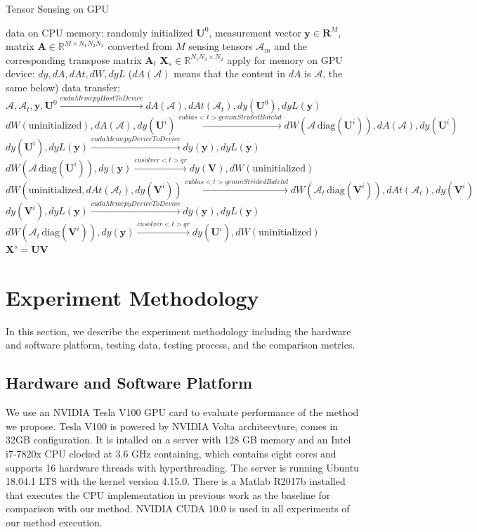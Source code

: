 \documentclass[journal,article,submit,moreauthors,pdftex,10pt,a4paper]{Definitions/mdpi}
\theoremstyle{plain}
\theoremstyle{definition}
\theoremstyle{remark}
\begin{document}
\begin{algorithm}
\caption{Tensor Sensing on GPU}
\label{alg:GPU}
\begin{algorithmic}[1]
    \Require data on CPU memory: randomly initialized $\mathbf{U}^0$, measurement vector $\mathbf{y} \in \mathbf{R}^M$, matrix $\mathbf{A} \in \mathbb{R}^{M \times N_1N_2N_3}$ converted from $M$ sensing tensors $\mathcal{A}_m$ and the corresponding transpose matrix $\mathbf{A}_t$
    \Ensure $\mathbf{X}_s \in \mathbb{R}^{N_1N_3 \times N_2}$
    \State apply for memory on GPU device: $dy, dA, dAt , dW, dyL$ ($dA(\mathcal{A})$ means that the content in $dA$ is $\mathcal{A}$, the same below)
    \State data transfer: $\mathcal{A}, \mathcal{A}_t, \mathbf{y}, \mathbf{U}^0 \stackrel{cudaMemcpyHostToDevice}{\longrightarrow} dA(\mathcal{A}), dAt(\mathcal{A}_t), dy(\mathbf{U}^0), dyL(\mathbf{y})$ 
        \State $dW(\text{uninitialized}), dA(\mathcal{A}), dy(\mathbf{U}^i) \stackrel{cublas<t>gemmStridedBatchd}{\longrightarrow} dW(\mathcal{A}\, \text{diag}(\mathbf{U}^i)), dA(\mathcal{A}), dy(\mathbf{U}^i)$
        \State  $dy(\mathbf{U}^i), dyL(\mathbf{y}) \stackrel{cudaMemcpyDeviceToDevice}{\longrightarrow} dy(\mathbf{y}), dyL(\mathbf{y})$
        \State $dW(\mathcal{A}\, \text{diag}(\mathbf{U}^i)), dy(\mathbf{y}) \stackrel{cusolver<t>qr}{\longrightarrow} dy(\mathbf{V}), dW(\text{uninitialized})$
        \State $dW(\text{uninitialized}, dAt(\mathcal{A}_t), dy(\mathbf{V}^i)) \stackrel{cublas<t>gemmStridedBatchd}{\longrightarrow} dW(\mathcal{A}_t\, \text{diag}(\mathbf{V}^i)), dAt(\mathcal{A}_t), dy(\mathbf{V}^i)$
        \State  $dy(\mathbf{V}^i), dyL(\mathbf{y}) \stackrel{cudaMemcpyDeviceToDevice}{\longrightarrow} dy(\mathbf{y}), dyL(\mathbf{y})$
        \State $dW(\mathcal{A}_t\, \text{diag}(\mathbf{V}^i)), dy(\mathbf{y}) \stackrel{cusolver<t>qr}{\longrightarrow} dy(\mathbf{U}^i), dW(\text{uninitialized})$
    \EndFor
    \State \Return $\mathbf{X}^s = \mathbf{U}\mathbf{V}$
\end{algorithmic}
\end{algorithm}

\section{Experiment Methodology}
In this section, we describe the experiment methodology including the hardware and software platform, testing data, testing process, and the comparison metrics.

\subsection{Hardware and Software Platform}
We use an NVIDIA Tesla V100 GPU card to evaluate performance of the method we propose. Tesla V100 is powered by NVIDIA Volta architecvture, comes in 32GB configuration. It is intalled on a server with 128 GB memory and an Intel i7-7820x CPU clocked at 3.6 GHz containing, which contains eight cores and supports 16 hardware threads with hyperthreading. The server is running Ubuntu 18.04.1 LTS with the kernel version 4.15.0. There is a Matlab R2017b installed that executes the CPU implementation in previous work as the baseline for comparison with our method. NVIDIA CUDA 10.0 is used in all experiments of our method execution.
\end{document}
